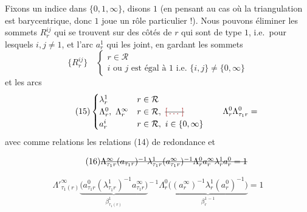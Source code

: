 \documentclass[11pt,a4paper]{article}
\begin{document}
Fixons  un indice dans $\{0, 1, \infty\}$, disons $1$ (en pensant au cas où la triangulation est barycentrique, donc  $1$ joue un rôle particulier !). Nous pouvons éliminer les sommets $R^{ij}_r$ qui se trouvent sur des côtés de $r$ qui sont de type $1$, i.e.\ pour lesquels $i, j \neq 1$, et l'arc $a^1_r$ qui les joint, en gardant les sommets
\begin{equation*}
  \tag{14} \{R^{ij}_r\} \quad
  \begin{cases}
    r \in \mathcal{R} \\
    i \text{ ou } j \text{ est égal à } 1 \text{ i.e.\ } \{i,j\} \neq \{0,\infty\}
  \end{cases}
\end{equation*}
et les arcs
\begin{equation*}
  \tag{15}
  \begin{cases}
    \lambda^1_r & r \in \mathcal{R} \\
    \Lambda^0_r,\ \Lambda^\infty_r & r \in \mathcal{R},\ \text{\struck{\ill{}}} \\
    a^i_r & r \in \mathcal{R},\ i \in \{0, \infty\}
  \end{cases}
  \qquad \Lambda^0_r \Lambda^0_{\tau_1 r} =
\end{equation*}
avec comme relations les relations (14) de redondance   et

\begin{equation*}
  \tag{16}
  \text{\struck{$\Lambda^\infty_{\tau_1 r} (a_{\tau_1 r})^{-1} \lambda^1_{\tau_1 r} (a^\infty_{\tau_1 r})^{-1} \Lambda^0_r a^\infty_r \lambda^1_r a^0_r = 1$}}
\end{equation*}

\begin{equation*}
  \tag{16}
  \boxed{\Lambda'^\infty_{\tau_1(r)}
  \underbrace{\bigl(a^0_{\tau_1 r} (\lambda^1_{\tau_1 r})^{-1} a^\infty_{\tau_1 r}\bigr)}_{\beta^1_{\tau_1(r)}}{}^{\!-1}
  \Lambda^0_r
  \underbrace{\bigl((a^\infty_r)^{-1} \lambda^1_r (a^0_r)^{-1}\bigr)}_{\beta^{1\,-1}_r} = 1}
\end{equation*}
\end{document}
